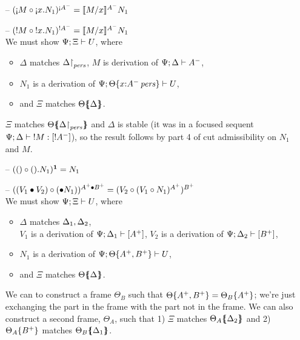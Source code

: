 \begin{itemize}
\item[--] $(\subst{\tgnabr{M}}{\tgnabl{x}{N_1}})^{{\scriptgnab}A^-}
           = \rsubsta{M}{x}{N_1}{A^-}$

\item[--] $(\subst{\tbangr{M}}{\tbangl{x}{N_1}})^{{!}A^-}
           = \rsubsta{M}{x}{N_1}{A^-}$ \smallskip\\
  We must show $\foc{\Psi}{\Xi}{U}$, where
  \begin{itemize}
  \item $\Delta$ matches $\restrictto{\Delta}{\mpers}$,
        $M$ is derivation of $\foc{\Psi}{\Delta}{A^-}$, 
  \item $N_1$ is a derivation of 
        $\foc{\Psi}{\tackon{\Theta}{x{:}\ispers{A^-}}}{U}$,
  \item and $\Xi$ matches $\frameoff{\Theta}{\Delta}$.
  \end{itemize}

  $\Xi$ matches $\frameoff{\Theta}{\restrictto{\Delta}{\mpers}}$
  and $\Delta$ is stable (it was in a focused
  sequent $\foct{\Psi}{\Delta}{\tbangr{M}}{[{!}A^-]}$),
  so the result follows by
  part 4 of cut admissibility on $N_1$ and $M$. 

\smallskip

\item[--] $(\subst{\toner}{\tonel{N}_1})^{\one} = N_1$

\item[--] $(\subst{(\tfuser{V_1}{V_2})}{(\tfusel{N_1}}))^{A^+ \fuse B^+}
           = (\subst{V_2}{(\subst{V_1}{N_1})^{A^+}})^{B^+}$ \smallskip\\
  We must show $\foc{\Psi}{\Xi}{U}$, where
  \begin{itemize}
  \item $\Delta$ matches $\matchconj{\Delta_1}{\Delta_2}$,\\
        $V_1$ is a derivation of $\foc{\Psi}{\Delta_1}{[A^+]}$,
        $V_2$ is a derivation of $\foc{\Psi}{\Delta_2}{[B^+]}$,
  \item $N_1$ is a derivation of 
        $\foc{\Psi}{\tackon{\Theta}{A^+, B^+}}{U}$, 
  \item and $\Xi$ matches $\frameoff{\Theta}{\Delta}$.
  \end{itemize}

  We can to construct a frame $\Theta_B$ such that
  $\tackon{\Theta}{\mkconj{A^+}{B^+}} = \tackon{\Theta_B}{A^+}$;
  we're just exchanging
  the part in the frame with the part not in the frame. We can also 
  construct a second frame, $\Theta_A$, such that
  1) $\Xi$ matches $\frameoff{\Theta_A}{\Delta_2}$ and 
  2) $\tackon{\Theta_A}{B^+}$ matches $\frameoff{\Theta_B}{\Delta_1}$.


\end{itemize}

